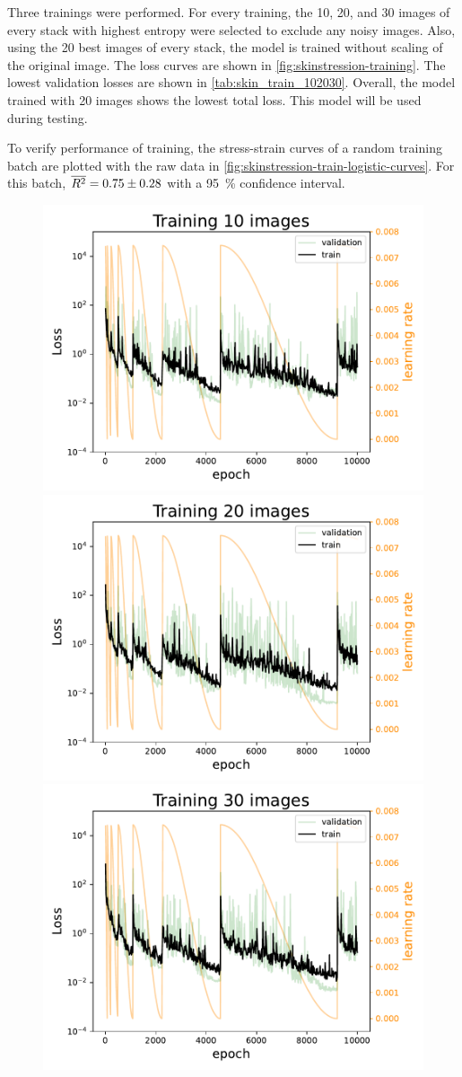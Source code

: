 Three trainings were performed.
For every training, the 10, 20, and 30 images of every stack with highest entropy were selected to exclude any noisy images.
Also, using the 20 best images of every stack, the model is trained without scaling of the original image.
The loss curves are shown in \cref{fig:skinstression-training}.
The lowest validation losses are shown in \cref{tab:skin_train_102030}.
Overall, the model trained with 20 images shows the lowest total loss.
This model will be used during testing.

To verify performance of training, the stress-strain curves of a random training batch are plotted with the raw data in \cref{fig:skinstression-train-logistic-curves}.
For this batch, $\overline{R^2} = \num{0.75 \pm 0.28}$ with a \qty{95}{\percent} confidence interval.


\begin{figure}
    \centering
    \includegraphics[width=0.48\linewidth]{skinstression/images/training/Training_10_images.pdf}
    \includegraphics[width=0.48\linewidth]{skinstression/images/training/Training_20_images.pdf} \\
    \includegraphics[width=0.48\linewidth]{skinstression/images/training/Training_30_images.pdf}

\end{figure}
